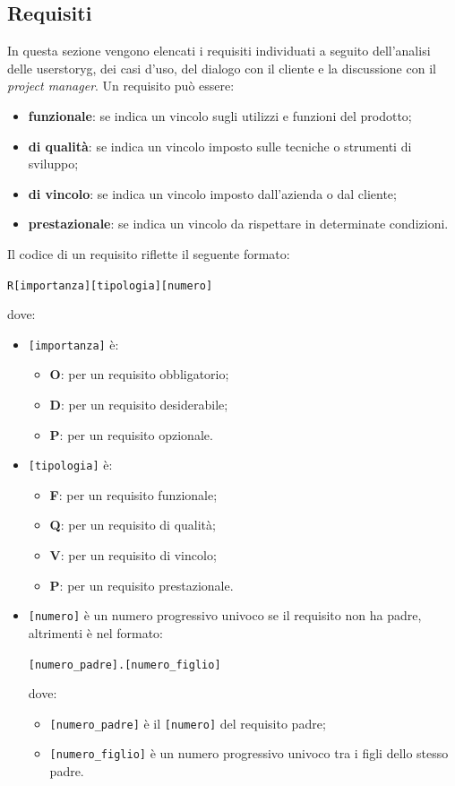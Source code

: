\subsection{Requisiti}
In questa sezione vengono elencati i requisiti individuati a seguito dell'analisi delle \gls{userstoryg}, dei casi d'uso, del dialogo con il cliente e la discussione con il \textit{project manager}. Un requisito può essere:
\begin{itemize}
    \item \textbf{funzionale}: se indica un vincolo sugli utilizzi e funzioni del prodotto;
    \item \textbf{di qualità}: se indica un vincolo imposto sulle tecniche o strumenti di sviluppo;
    \item \textbf{di vincolo}: se indica un vincolo imposto dall'azienda o dal cliente;
    \item \textbf{prestazionale}: se indica un vincolo da rispettare in determinate condizioni. 
\end{itemize}

\noindent Il codice di un requisito riflette il seguente formato:
\begin{center}
    \texttt{R[importanza][tipologia][numero]}
\end{center}
\noindent dove:
\begin{itemize}
    \item \texttt{[importanza]} è:
    \begin{itemize}
        \item \textbf{O}: per un requisito obbligatorio;
        \item \textbf{D}: per un requisito desiderabile;
        \item \textbf{P}: per un requisito opzionale.
    \end{itemize}
    \item \texttt{[tipologia]} è:
    \begin{itemize}
        \item \textbf{F}: per un requisito funzionale;
        \item \textbf{Q}: per un requisito di qualità;
        \item \textbf{V}: per un requisito di vincolo;
        \item \textbf{P}: per un requisito prestazionale.
    \end{itemize}
    \item \texttt{[numero]} è un numero progressivo univoco se il requisito non ha padre, altrimenti è nel formato: \begin{center} \texttt{[numero\_padre].[numero\_figlio]} \end{center} dove:
    \begin{itemize}
        \item \texttt{[numero\_padre]} è il \texttt{[numero]} del requisito padre;
        \item \texttt{[numero\_figlio]} è un numero progressivo univoco tra i figli dello stesso padre.
    \end{itemize}
\end{itemize}

